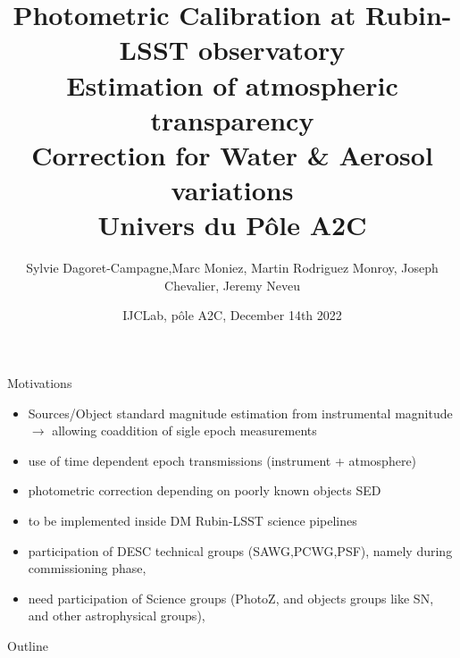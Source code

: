 \documentclass{beamer}
\title[Atmospheric transparency at LSST Obs]{\large Photometric Calibration at Rubin-LSST observatory \\
Estimation of atmospheric transparency \\ Correction for Water \& Aerosol variations\\
{\small Univers du Pôle A2C}}
\author[S. Dagoret-Campagne]{
Sylvie Dagoret-Campagne,Marc Moniez, Martin Rodriguez Monroy, Joseph Chevalier,
Jeremy Neveu
}
\institute[IJCLab]{
  IJCLab,
  CNRS/IN2P3 \& Université Paris-Saclay,
  Orsay, France }
\date[IJCLab, Dec 14th 2022]{IJCLab, pôle A2C, December 14th 2022}
\begin{document}
\begin{frame}
  \titlepage
\end{frame}



\begin{frame}{Motivations}
\begin{itemize}
\item Sources/Object standard magnitude estimation from instrumental magnitude $\rightarrow$ allowing coaddition of sigle epoch measurements
\item use of time dependent epoch transmissions (instrument + atmosphere)
\item photometric correction depending on poorly known objects SED
\item to be implemented inside DM Rubin-LSST science pipelines 
\item participation of DESC technical groups (SAWG,PCWG,PSF), namely during commissioning phase,
\item need participation of Science groups (PhotoZ, and objects groups like SN, and other astrophysical groups),
\end{itemize}
\end{frame}

\begin{frame}{Outline}
  \tableofcontents
\end{frame}



\end{document}
